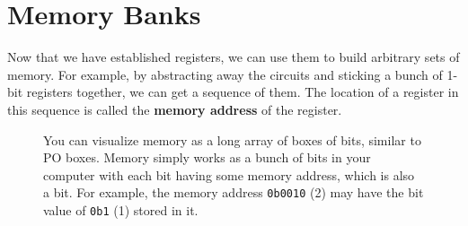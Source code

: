 \section{Memory Banks}

  Now that we have established registers, we can use them to build arbitrary sets of memory. For example, by abstracting away the circuits and sticking a bunch of 1-bit registers together, we can get a sequence of them. The location of a register in this sequence is called the \textbf{memory address} of the register. 

  \begin{figure}[H]
    \centering 
    \caption{You can visualize memory as a long array of boxes of bits, similar to PO boxes. Memory simply works as a bunch of bits in your computer with each bit having some memory address, which is also a bit. For example, the memory address \texttt{0b0010} (2) may have the bit value of \texttt{0b1} (1) stored in it. } 
  \end{figure}

